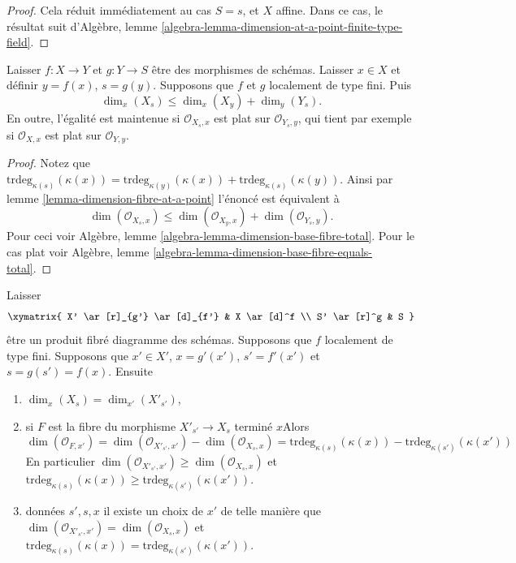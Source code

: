 \begin{proof}
Cela réduit immédiatement au cas $S = s$, et $X$ affine. Dans ce cas, le résultat suit d'Algèbre, lemme \ref{algebra-lemma-dimension-at-a-point-finite-type-field}.
\end{proof}

\begin{lemma}

\label{lemma-dimension-fibre-at-a-point-additive}
Laisser $f : X \to Y$ et $g : Y \to S$ être des morphismes de schémas. Laisser $x \in X$ et définir $y = f(x)$, $s = g(y)$. Supposons que $f$ et $g$ localement de type fini. Puis $$
\dim_x(X_s) \leq \dim_x(X_y) + \dim_y(Y_s).
$$ En outre, l'égalité est maintenue si $\mathcal{O}_{X_s, x}$ est plat sur $\mathcal{O}_{Y_s, y}$, qui tient par exemple si $\mathcal{O}_{X, x}$ est plat sur $\mathcal{O}_{Y, y}$.
\end{lemma}

\begin{proof}
Notez que $\text{trdeg}_{\kappa(s)}(\kappa(x)) =
\text{trdeg}_{\kappa(y)}(\kappa(x)) + \text{trdeg}_{\kappa(s)}(\kappa(y))$. Ainsi par lemme \ref{lemma-dimension-fibre-at-a-point} l'énoncé est équivalent à $$
\dim(\mathcal{O}_{X_s, x})
\leq
\dim(\mathcal{O}_{X_y, x}) + \dim(\mathcal{O}_{Y_s, y}).
$$ Pour ceci voir Algèbre, lemme \ref{algebra-lemma-dimension-base-fibre-total}. Pour le cas plat voir Algèbre, lemme \ref{algebra-lemma-dimension-base-fibre-equals-total}.
\end{proof}

\begin{lemma}

\label{lemma-dimension-fibre-after-base-change}

Laisser
$$
\xymatrix{
X' \ar[r]_{g'} \ar[d]_{f'} & X \ar[d]^f \\
S' \ar[r]^g & S
}
$$
être un produit fibré diagramme des schémas. Supposons que $f$ localement de type fini. Supposons que $x' \in X'$, $x = g'(x')$, $s' = f'(x')$ et
$s = g(s') = f(x)$. Ensuite

\begin{enumerate}

\item  $\dim_x(X_s) = \dim_{x'}(X'_{s'})$,
\item si $F$ est la fibre du morphisme $X'_{s'} \to X_s$
terminé $x$Alors
$$
\dim(\mathcal{O}_{F, x'}) =
\dim(\mathcal{O}_{X'_{s'}, x'}) - \dim(\mathcal{O}_{X_s, x}) =
\text{trdeg}_{\kappa(s)}(\kappa(x)) -
\text{trdeg}_{\kappa(s')}(\kappa(x'))
$$
En particulier $\dim(\mathcal{O}_{X'_{s'}, x'}) \geq \dim(\mathcal{O}_{X_s, x})$
et $\text{trdeg}_{\kappa(s)}(\kappa(x)) \geq
\text{trdeg}_{\kappa(s')}(\kappa(x'))$.
\item données $s', s, x$ il existe un choix de $x'$ de telle manière que
$\dim(\mathcal{O}_{X'_{s'}, x'}) = \dim(\mathcal{O}_{X_s, x})$ et
$\text{trdeg}_{\kappa(s)}(\kappa(x)) = \text{trdeg}_{\kappa(s')}(\kappa(x'))$.

\end{enumerate}

\end{lemma}

